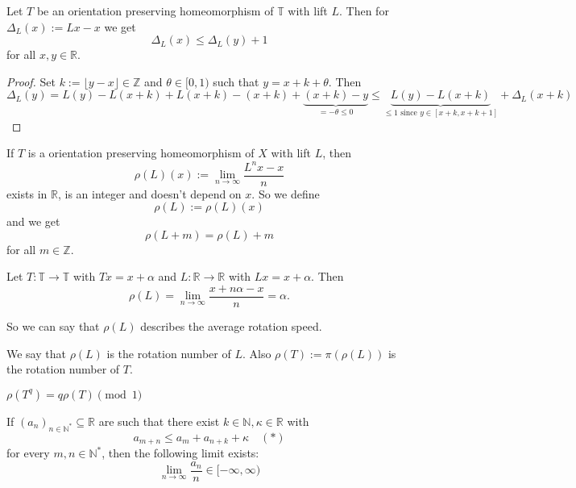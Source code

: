\documentclass{article}
\newcommand*{\N}{\mathbb{N}}
\newcommand*{\Z}{\mathbb{Z}}
\newcommand*{\R}{\mathbb{R}}
\newcommand*{\T}{\mathbb{T}}
\newcommand*{\Ns}{\N^*}
\newcommand*{\limn}{\lim_{n\to\infty}}
\begin{document}
\begin{lem}
    Let $T$ be an orientation preserving homeomorphism of $\T$ with lift $L$. Then for $\Delta_L(x) := Lx-x$ we get
    $$\Delta_L(x)\leq \Delta_L(y)+1$$
    for all $x,y\in\R$.
\end{lem}

\begin{proof}
    Set $k:=\lfloor y-x\rfloor\in\Z$ and $\theta\in[0,1)$ such that $y=x+k+\theta$. Then
    $$\Delta_L(y)=L(y)-L(x+k)+L(x+k)-(x+k)+\underbrace{(x+k)-y}_{=-\theta\leq0} \leq \underbrace{L(y)-L(x+k)}_{\leq 1 \text{ since } y\in[x+k,x+k+1]}+\Delta_L(x+k)$$
\end{proof}

\begin{rem}[Recall:]
    If $T$ is a orientation preserving homeomorphism of $X$ with lift $L$, then
    $$\rho(L)(x):=\limn\frac{L^nx-x}n$$
    exists in $\R$, is an integer and doesn't depend on $x$. So we define
    $$\rho(L):=\rho(L)(x)$$
    and we get
    $$\rho(L+m)=\rho(L)+m$$
    for all $m\in\Z$.
\end{rem}

\begin{exam}
    Let $T:\T\to\T$ with $Tx=x+\alpha$ and $L:\R\to\R$ with $Lx=x+\alpha$. Then
    $$\rho(L)=\limn\frac{x+n\alpha-x}n = \alpha.$$
\end{exam}

So we can say that $\rho(L)$ describes the average rotation speed.

\begin{defin}
    We say that $\rho(L)$ is the rotation number of $L$. Also $\rho(T):=\pi(\rho(L))$ is the rotation number of $T$.
\end{defin}

\begin{rem}
    $\rho(T^q)=q\rho(T)\pmod1$
\end{rem}

\begin{lem}
    If $(a_n)_{n\in\Ns}\subseteq\R$ are such that there exist $k\in\N,\kappa\in\R$ with
    $$a_{m+n}\leq a_m+a_{n+k}+\kappa\quad (*)$$
    for every $m,n\in\Ns$, then the following limit exists:
    $$\limn \frac{a_n}n\in[-\infty,\infty)$$
\end{lem}
\end{document}
